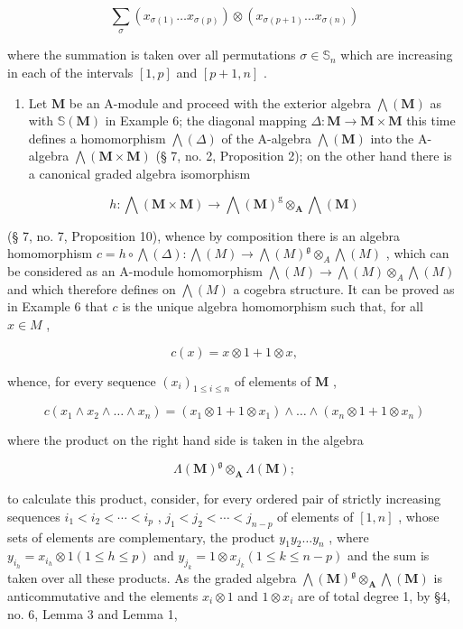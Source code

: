 \[
\sum_ {\sigma} \left(x _ {\sigma (1)} \dots x _ {\sigma (p)}\right) \otimes \left(x _ {\sigma (p + 1)} \dots x _ {\sigma (n)}\right)\tag{6}
\]

where the summation is taken over all permutations \(\sigma\in\mathbb{S}_{n}\) which are increasing in each of the intervals \([1,p]\) and \([p+1,n]\) .

\begin{enumerate}
\def\labelenumi{(\arabic{enumi})}
\setcounter{enumi}{6}
\tightlist
\item
  Let \(\mathbf{M}\) be an A-module and proceed with the exterior algebra \(\bigwedge (\mathbf{M})\) as with \(\mathbb{S}(\mathbf{M})\) in Example 6; the diagonal mapping \(\Delta : \mathbf{M} \to \mathbf{M} \times \mathbf{M}\) this time defines a homomorphism \(\bigwedge (\Delta)\) of the A-algebra \(\bigwedge (\mathbf{M})\) into the A-algebra \(\bigwedge (\mathbf{M} \times \mathbf{M})\) (§ 7, no. 2, Proposition 2); on the other hand there is a canonical graded algebra isomorphism
\end{enumerate}

\[
h: \bigwedge (\mathbf {M} \times \mathbf {M}) \rightarrow \bigwedge (\mathbf {M}) ^ {\mathrm{g}} \otimes_ {\mathbf {A}} \bigwedge (\mathbf {M})
\]

(§ 7, no. 7, Proposition 10), whence by composition there is an algebra homomorphism \(c = h \circ \bigwedge(\Delta): \bigwedge(M) \to \bigwedge(M)^{\mathfrak{g}} \otimes_{A} \bigwedge(M)\) , which can be considered as an A-module homomorphism \(\bigwedge(M) \to \bigwedge(M) \otimes_{A} \bigwedge(M)\) and which therefore defines on \(\bigwedge(M)\) a cogebra structure. It can be proved as in Example 6 that \(c\) is the unique algebra homomorphism such that, for all \(x \in M\) ,

\[
c (x) = x \otimes 1 + 1 \otimes x,\tag{7}
\]

whence, for every sequence \((x_{i})_{1\leqslant i\leqslant n}\) of elements of \(\mathbf{M}\) ,

\[
c \left(x _ {1} \wedge x _ {2} \wedge \dots \wedge x _ {n}\right) = \left(x _ {1} \otimes 1 + 1 \otimes x _ {1}\right) \wedge \dots \wedge \left(x _ {n} \otimes 1 + 1 \otimes x _ {n}\right)
\]

where the product on the right hand side is taken in the algebra

\[
\Lambda (\mathbf {M}) ^ {\mathfrak {g}} \otimes_ {\mathbf {A}} \Lambda (\mathbf {M});
\]

to calculate this product, consider, for every ordered pair of strictly increasing sequences \(i_1 < i_2 < \cdots < i_p\) , \(j_1 < j_2 < \cdots < j_{n-p}\) of elements of \([1, n]\) , whose sets of elements are complementary, the product \(y_1y_2\ldots y_n\) , where \(y_{i_h} = x_{i_h} \otimes 1 (1 \leqslant h \leqslant p)\) and \(y_{j_k} = 1 \otimes x_{j_k} (1 \leqslant k \leqslant n - p)\) and the sum is taken over all these products. As the graded algebra \(\bigwedge (\mathbf{M})^{\mathfrak{g}} \otimes_{\mathbf{A}} \bigwedge (\mathbf{M})\) is anticommutative and the elements \(x_i \otimes 1\) and \(1 \otimes x_i\) are of total degree 1, by §4, no. 6, Lemma 3 and Lemma 1,

